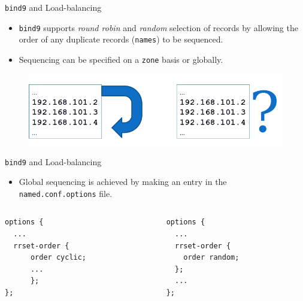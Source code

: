 \documentclass[xcolor=table,aspectratio=169]{beamer}
\begin{document}
\begin{frame}{\texttt{bind9} and Load-balancing}
  \begin{itemize}
    \item \texttt{bind9} supports \textit{round robin} and \textit{random} selection of records by allowing the order of any duplicate records (\texttt{names}) to be sequenced.
    \item Sequencing can be specified on a \texttt{zone} basis or globally.
  \end{itemize}
  \begin{figure}
    \begin{center}
      \includegraphics[width=1\linewidth]{rrset.png}
    \end{center}
  \end{figure}
\end{frame}

\begin{frame}[fragile]{\texttt{bind9} and Load-balancing}
  \begin{itemize}
    \item Global sequencing is achieved by making an entry in the \texttt{named.conf.options} file.
  \end{itemize}
  \begin{columns}
    \begin{column}{0.5\textwidth}
      \begin{tcolorbox}
        \lstset{
          basicstyle=\scriptsize\ttfamily,
        }
    \begin{lstlisting}
options {
  ...
  rrset-order {
      order cyclic;
      ...
      };
};
    \end{lstlisting}
      \end{tcolorbox}
    \end{column}
    \begin{column}{0.5\textwidth}
      \begin{tcolorbox}
        \lstset{
          basicstyle=\scriptsize\ttfamily,
        }
    \begin{lstlisting}
options {
  ...
  rrset-order {
    order random;
  };
  ...
};
    \end{lstlisting}
      \end{tcolorbox}
    \end{column}
  \end{columns}
\end{frame}
\end{document}
